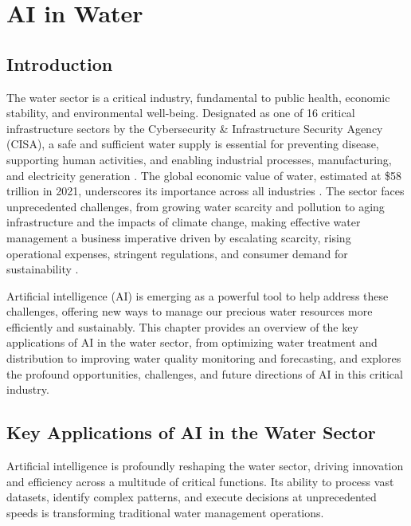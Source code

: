 \chapter{AI in Water}
\label{cha:ai_in_water}

\section{Introduction}

The water sector is a critical industry, fundamental to public health, economic stability, and environmental well-being. Designated as one of 16 critical infrastructure sectors by the Cybersecurity \& Infrastructure Security Agency (CISA), a safe and sufficient water supply is essential for preventing disease, supporting human activities, and enabling industrial processes, manufacturing, and electricity generation \cite{DomesticPreparedness_Critical, CISA_Critical}. The global economic value of water, estimated at \$58 trillion in 2021, underscores its importance across all industries \cite{WEForum_Critical}. The sector faces unprecedented challenges, from growing water scarcity and pollution to aging infrastructure and the impacts of climate change, making effective water management a business imperative driven by escalating scarcity, rising operational expenses, stringent regulations, and consumer demand for sustainability \cite{AnteaGroup_Critical, Everfilt_Critical}.

Artificial intelligence (AI) is emerging as a powerful tool to help address these challenges, offering new ways to manage our precious water resources more efficiently and sustainably. This chapter provides an overview of the key applications of AI in the water sector, from optimizing water treatment and distribution to improving water quality monitoring and forecasting, and explores the profound opportunities, challenges, and future directions of AI in this critical industry.

\section{Key Applications of AI in the Water Sector}

Artificial intelligence is profoundly reshaping the water sector, driving innovation and efficiency across a multitude of critical functions. Its ability to process vast datasets, identify complex patterns, and execute decisions at unprecedented speeds is transforming traditional water management operations.


